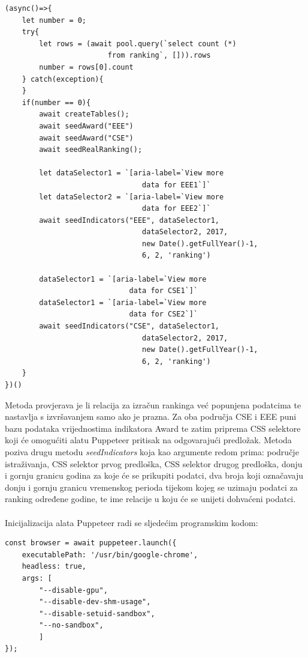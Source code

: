\documentclass[times, utf8, zavrsni]{fer}
\begin{document}
\begin{lstlisting}  
(async()=>{
    let number = 0;
    try{
        let rows = (await pool.query(`select count (*) 
                        from ranking`, [])).rows
        number = rows[0].count
    } catch(exception){
    }
    if(number == 0){
        await createTables();
        await seedAward("EEE")
        await seedAward("CSE")
        await seedRealRanking();
            
        let dataSelector1 = `[aria-label=`View more 
                                data for EEE1`]`
        let dataSelector2 = `[aria-label=`View more 
                                data for EEE2`]`
        await seedIndicators("EEE", dataSelector1, 
                                dataSelector2, 2017, 
                                new Date().getFullYear()-1, 
                                6, 2, 'ranking')
    
        dataSelector1 = `[aria-label=`View more
                             data for CSE1`]`
        dataSelector1 = `[aria-label=`View more
                             data for CSE2`]`
        await seedIndicators("CSE", dataSelector1, 
                                dataSelector2, 2017, 
                                new Date().getFullYear()-1,
                                6, 2, 'ranking')
    }
})()
\end{lstlisting}    
Metoda provjerava je li relacija za izračun rankinga već popunjena podatcima te nastavlja s izvršavanjem samo ako je prazna. 
Za oba područja CSE i EEE puni bazu podataka vrijednostima indikatora Award te zatim priprema CSS selektore koji će omogućiti alatu 
Puppeteer pritisak na odgovarajući predložak. Metoda poziva drugu metodu \emph{seedIndicators} koja kao argumente redom prima:
područje istraživanja, CSS selektor prvog predloška, CSS selektor drugog predloška, donju i gornju granicu godina za koje će se prikupiti
podatci, dva broja koji označavaju donju i gornju granicu vremenskog perioda tijekom kojeg se uzimaju podatci za ranking određene godine, te 
ime relacije u koju će se unijeti dohvaćeni podatci.
\\\\Inicijalizacija alata Puppeteer radi se sljedećim programskim kodom:
\begin{lstlisting}  
const browser = await puppeteer.launch({
    executablePath: '/usr/bin/google-chrome',
    headless: true,
    args: [
        "--disable-gpu",
        "--disable-dev-shm-usage",
        "--disable-setuid-sandbox",
        "--no-sandbox",
        ]
});
\end{lstlisting} 
\end{document}
